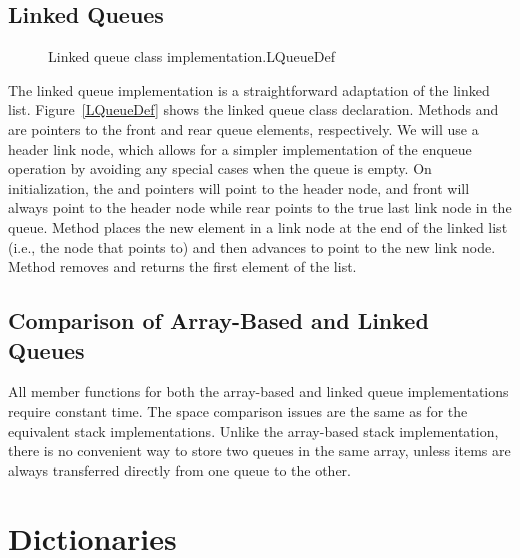 
\subsection{Linked Queues}

\begin{figure}

\vspace{-\medskipamount}
{Linked queue class implementation.}{LQueueDef}
\end{figure}

The linked queue implementation is a straightforward adaptation
of the linked list.
Figure~\ref{LQueueDef} shows the linked queue class declaration.
Methods  and  are pointers to the front and
rear queue elements, respectively.
We will use a header link node, which allows for a
simpler implementation of the enqueue operation by avoiding any
special cases when the queue is empty.
On initialization, the  and  pointers will
point to the header node, and front will always point to the header
node while rear points to the true last link node in the queue.
Method  places the new element in a link
node at the end of the linked list (i.e., the node that 
points to) and then advances  to point to the new link node.
Method  removes and returns the
first element of the list.

\subsection{Comparison of Array-Based and Linked Queues}

All member functions for both the array-based and linked queue
implementations require constant time.
The space comparison issues are the same as for the equivalent stack
implementations.
Unlike the array-based stack implementation, there is no convenient
way to store two queues in the same array,
unless items are always transferred directly from one queue to the other.

\section{Dictionaries}
\label{Dictionary}

